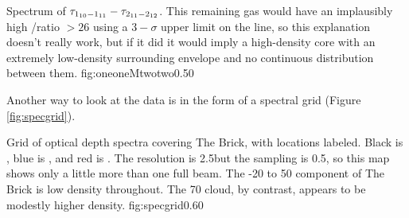{Spectrum of $\tau_{1_{10}-1_{11}} - \tau_{2_{11}-2_{12}}$.  This remaining gas would have an implausibly
high \oneone/\twotwo ratio $ > 26$ using a $3-\sigma$ upper limit on the \twotwo line, so 
this explanation doesn't really work, but if it did it would imply a high-density core with an extremely low-density
surrounding envelope and no continuous distribution between them.}
{fig:oneoneMtwotwo}{0.5}{0}

Another way to look at the data is in the form of a spectral grid (Figure \ref{fig:specgrid}).


{Grid of optical depth spectra covering The Brick, with locations labeled.
Black is \formaldehyde \oneone, blue is \formaldehydeIso \oneone, and red is
\formaldehyde \twotwo.  The resolution is 2.5\arcmin but the sampling is
0.5\arcmin, so this map shows only a little more than one full beam.  The -20
to 50 \kms component of The Brick is low density throughout.  The 70 \kms
cloud, by contrast, appears to be modestly higher density.}
{fig:specgrid}{0.6}{0}




